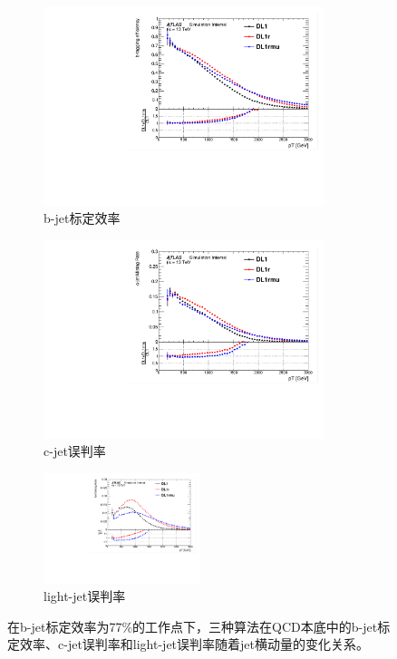 \begin{figure}[!thbp]
  \begin{subfigure}{.5\textwidth}
  \centering
  \includegraphics[width=0.9\textwidth]{figuresDijet/02-Selection/QCD/Comparebtageff_Fix77.pdf}
  \caption{b-jet标定效率}
  \end{subfigure}
  \begin{subfigure}{.5\textwidth}
  \centering
   \includegraphics[width=0.9\textwidth]{figuresDijet/02-Selection/QCD/Comparectageff_Fix77.pdf}
  \caption{c-jet误判率}
  \end{subfigure}
\newline 
  \begin{subfigure}{.99\textwidth}
  \centering
  \includegraphics[width=0.5\textwidth]{figuresDijet/02-Selection/QCD/Compareltageff_Fix77.pdf}
  \caption{light-jet误判率}
  \end{subfigure}
\caption{
在b-jet标定效率为77\%的工作点下，三种算法在QCD本底中的b-jet标定效率、c-jet误判率和light-jet误判率随着jet横动量的变化关系。
}
\label{fig:btagperf_qcd_fix77}
\end{figure}


